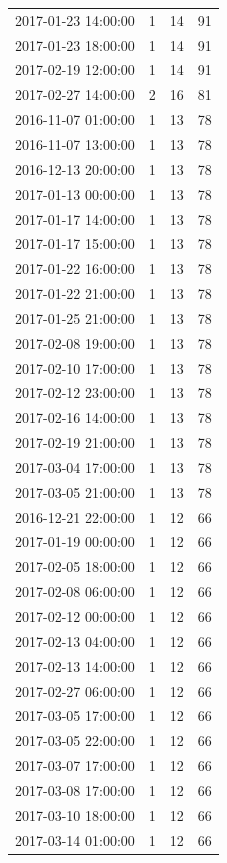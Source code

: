 \begin{tabular}{lrrr}
2017-01-23 14:00:00 & 1 & 14 & 91 \\
2017-01-23 18:00:00 & 1 & 14 & 91 \\
2017-02-19 12:00:00 & 1 & 14 & 91 \\
2017-02-27 14:00:00 & 2 & 16 & 81 \\
2016-11-07 01:00:00 & 1 & 13 & 78 \\
2016-11-07 13:00:00 & 1 & 13 & 78 \\
2016-12-13 20:00:00 & 1 & 13 & 78 \\
2017-01-13 00:00:00 & 1 & 13 & 78 \\
2017-01-17 14:00:00 & 1 & 13 & 78 \\
2017-01-17 15:00:00 & 1 & 13 & 78 \\
2017-01-22 16:00:00 & 1 & 13 & 78 \\
2017-01-22 21:00:00 & 1 & 13 & 78 \\
2017-01-25 21:00:00 & 1 & 13 & 78 \\
2017-02-08 19:00:00 & 1 & 13 & 78 \\
2017-02-10 17:00:00 & 1 & 13 & 78 \\
2017-02-12 23:00:00 & 1 & 13 & 78 \\
2017-02-16 14:00:00 & 1 & 13 & 78 \\
2017-02-19 21:00:00 & 1 & 13 & 78 \\
2017-03-04 17:00:00 & 1 & 13 & 78 \\
2017-03-05 21:00:00 & 1 & 13 & 78 \\
2016-12-21 22:00:00 & 1 & 12 & 66 \\
2017-01-19 00:00:00 & 1 & 12 & 66 \\
2017-02-05 18:00:00 & 1 & 12 & 66 \\
2017-02-08 06:00:00 & 1 & 12 & 66 \\
2017-02-12 00:00:00 & 1 & 12 & 66 \\
2017-02-13 04:00:00 & 1 & 12 & 66 \\
2017-02-13 14:00:00 & 1 & 12 & 66 \\
2017-02-27 06:00:00 & 1 & 12 & 66 \\
2017-03-05 17:00:00 & 1 & 12 & 66 \\
2017-03-05 22:00:00 & 1 & 12 & 66 \\
2017-03-07 17:00:00 & 1 & 12 & 66 \\
2017-03-08 17:00:00 & 1 & 12 & 66 \\
2017-03-10 18:00:00 & 1 & 12 & 66 \\
2017-03-14 01:00:00 & 1 & 12 & 66 \\

\end{tabular}
